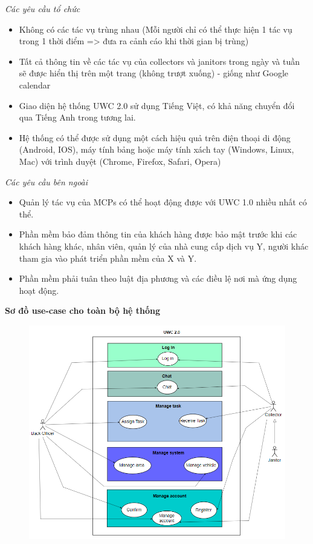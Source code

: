 \documentclass[a4paper]{article}
\begin{document}
\textit{Các yêu cầu tổ chức}
\begin{itemize}
\item Không có các tác vụ trùng nhau (Mỗi người chỉ có thể thực hiện 1 tác vụ trong 1 thời điểm => đưa ra cảnh cáo khi thời gian bị trùng)
\item Tất cả thông tin về các tác vụ của collectors và janitors trong ngày và tuần sẽ được hiển thị trên một trang (không trượt xuống) - giống như Google calendar  \item Giao diện hệ thống UWC 2.0 sử dụng Tiếng Việt, có khả năng chuyển đổi qua Tiếng Anh trong tương lai.
\item Hệ thống có thể được sử dụng một cách hiệu quả trên điện thoại di động (Android, IOS), máy tính bảng hoặc máy tính xách tay (Windows, Linux, Mac) với trình duyệt (Chrome, Firefox, Safari, Opera)
\end{itemize}
\textit{Các yêu cầu bên ngoài}
\begin{itemize}
\item  Quản lý tác vụ của MCPs có thể hoạt động được với UWC 1.0 nhiều nhất có thể.
\item  Phần mềm bảo đảm thông tin của khách hàng được bảo mật trước khi các khách hàng khác, nhân viên, quản lý của nhà cung cấp dịch vụ Y, người khác tham gia vào phát triển phần mềm của X và Y.
\item  Phần mềm phải tuân theo luật địa phương và các điều lệ nơi mà ứng dụng hoạt động.
\newpage
\end{itemize}
\textbf{Sơ đồ use-case cho toàn bộ hệ thống}
 \begin{figure}[!h]
    \begin{center}
      \includegraphics[width=6in]{Image/whole_system.png}
    \end{center}
\end{figure}
\end{document}
